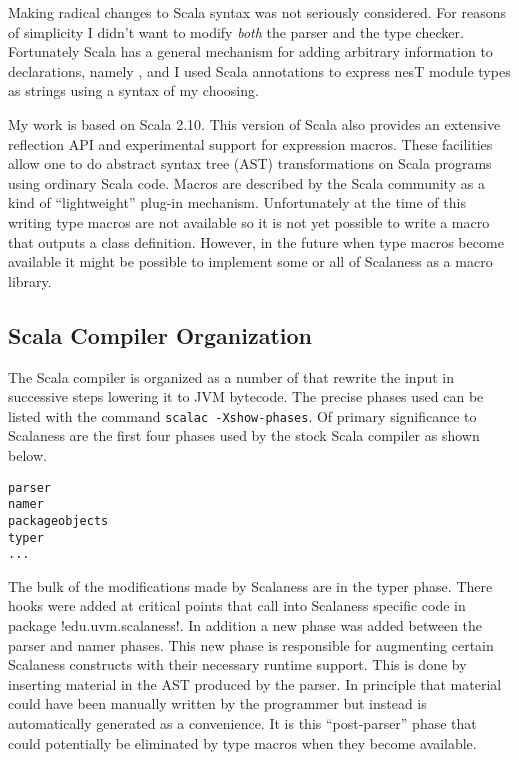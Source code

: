 Making radical changes to Scala syntax was not seriously considered. For reasons of simplicity I
didn't want to modify \emph{both} the parser and the type checker. Fortunately Scala has a
general mechanism for adding arbitrary information to declarations, namely
, and I used Scala annotations to express nesT module types as strings
using a syntax of my choosing.

My work is based on Scala 2.10. This version of Scala also provides an extensive reflection API
and experimental support for expression macros. These facilities allow one to do abstract syntax
tree (AST) transformations on Scala programs using ordinary Scala code. Macros are described by
the Scala community as a kind of ``lightweight'' plug-in mechanism. Unfortunately at the time of
this writing type macros are not available so it is not yet possible to write a macro that
outputs a class definition. However, in the future when type macros become available it might be
possible to implement some or all of Scalaness as a macro library.

\subsection{Scala Compiler Organization}
\label{section-scala-compiler-organization}

The Scala compiler is organized as a number of  that rewrite the input in
successive steps lowering it to JVM bytecode. The precise phases used can be listed with the
command \texttt{scalac -Xshow-phases}. Of primary significance to Scalaness are the first four
phases used by the stock Scala compiler as shown below.

\singlespace
\begin{Verbatim}
parser
namer
packageobjects
typer
...
\end{Verbatim}
\primaryspacing

The bulk of the modifications made by Scalaness are in the typer phase. There hooks were added
at critical points that call into Scalaness specific code in package !edu.uvm.scalaness!. In
addition a new phase was added between the parser and namer phases. This new phase is
responsible for augmenting certain Scalaness constructs with their necessary runtime support.
This is done by inserting material in the AST produced by the parser. In principle that material
could have been manually written by the programmer but instead is automatically generated as a
convenience. It is this ``post-parser'' phase that could potentially be eliminated by type
macros when they become available.

